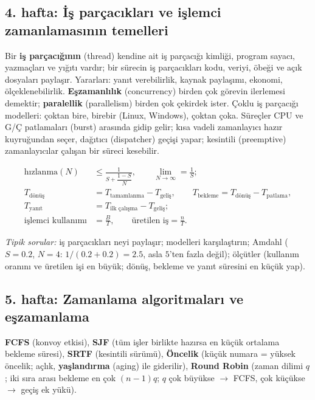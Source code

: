 \documentclass[11pt,a4paper]{article}
\newcommand{\term}[1]{\textbf{\color{mintdeep}#1}}
\begin{document}
\subsection{4. hafta: İş parçacıkları ve işlemci zamanlamasının temelleri}
Bir \term{iş parçacığının} (thread) kendine ait iş parçacığı kimliği, program sayacı, yazmaçları ve yığıtı vardır; bir sürecin iş parçacıkları kodu, veriyi, öbeği ve açık dosyaları paylaşır. Yararları: yanıt verebilirlik, kaynak paylaşımı, ekonomi, ölçeklenebilirlik. \term{Eşzamanlılık} (concurrency) birden çok görevin ilerlemesi demektir; \term{paralellik} (parallelism) birden çok çekirdek ister. Çoklu iş parçacığı modelleri: çoktan bire, birebir (Linux, Windows), çoktan çoka. Süreçler CPU ve G/Ç patlamaları (burst) arasında gidip gelir; kısa vadeli zamanlayıcı hazır kuyruğundan seçer, dağıtıcı (dispatcher) geçişi yapar; kesintili (preemptive) zamanlayıcılar çalışan bir süreci kesebilir.
\begin{example}
\begin{align*}
\text{hızlanma}(N) &\le \frac{1}{S + \dfrac{1-S}{N}}, \qquad \lim_{N\to\infty} = \frac{1}{S};\\
T_{\text{dönüş}} &= T_{\text{tamamlanma}} - T_{\text{geliş}},\qquad
T_{\text{bekleme}} = T_{\text{dönüş}} - T_{\text{patlama}},\\
T_{\text{yanıt}} &= T_{\text{ilk çalışma}} - T_{\text{geliş}};\\
\text{işlemci kullanımı} &= \frac{B}{T}, \qquad \text{üretilen iş} = \frac{n}{T}.
\end{align*}
\end{example}
\textit{Tipik sorular:} iş parçacıkları neyi paylaşır; modelleri karşılaştırın; Amdahl ($S = 0.2$, $N = 4$: $1/(0.2+0.2) = 2.5$, asla $5$'ten fazla değil); ölçütler (kullanım oranını ve üretilen işi en büyük; dönüş, bekleme ve yanıt süresini en küçük yap).

\subsection{5. hafta: Zamanlama algoritmaları ve eşzamanlama}
\textbf{FCFS} (konvoy etkisi), \textbf{SJF} (tüm işler birlikte hazırsa en küçük ortalama bekleme süresi), \textbf{SRTF} (kesintili sürümü), \textbf{Öncelik} (küçük numara = yüksek öncelik; açlık, \term{yaşlandırma} (aging) ile giderilir), \textbf{Round Robin} (zaman dilimi $q$; iki sıra arası bekleme en çok $(n-1)q$; $q$ çok büyükse $\to$ FCFS, çok küçükse $\to$ geçiş ek yükü).
\end{document}
